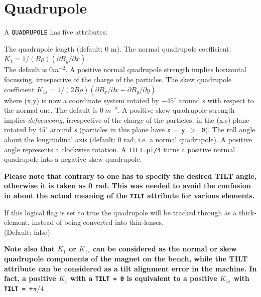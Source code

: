 \section{Quadrupole}
\label{sec:quadrupole}



A \texttt{QUADRUPOLE} has five attributes:     
\begin{madlist}
    The quadrupole length (default: 0 m). 
    The normal quadrupole coefficient:        
     $K_1 = 1/(B \rho) (\partial B_y / \partial x)$.\\ 
     The default is $0 m^{-2}$. A positive normal quadrupole strength
     implies horizontal focussing, irrespective of the charge of the particles.
    The skew quadrupole coefficient 
     $K_{1s} = 1/(2 B \rho) (\partial B_x / \partial x - \partial B_y / \partial y)$\\  
     where (x,y) is now a coordinate system rotated by $-45^\circ$ around s
     with respect to the normal one. The default is $0\ m^{-2}$. A
     positive skew quadrupole strength implies \textsl{defocussing}, 
     irrespective of the charge of the particles,  
     in the (x,s) plane rotated by $45^\circ$
     around \textit{s} (particles in this plane have \texttt{x = y $>$ 0}). 
    The roll angle about the longitudinal axis (default: 0
     rad, i.e. a normal quadrupole). A positive angle represents a
     clockwise rotation. A \texttt{TILT=pi/4} turns a positive normal quadrupole
     into a negative skew quadrupole.          

   \textbf{Please note that contrary to \madeight one has to
     specify the desired TILT angle, otherwise it is taken as
     0 rad. This was needed to avoid the confusion in \madeight
     about the actual meaning of the \texttt{TILT} attribute for
     various elements.} 

     If this logical flag is set to true the quadrupole
    will be tracked through as a thick-element, instead of being
    converted into thin-lenses.\\
    (Default: false)
\end{madlist}

\textbf{Note also that $K_1$ or $K_{1s}$ can be considered as
  the normal or skew quadrupole components of the magnet on
  the bench, while the TILT attribute can be considered as a
  tilt alignment error in the machine. In fact, a positive
  $K_1$ with a \texttt{TILT = 0} is equivalent to a positive $K_{1s}$
  with \texttt{TILT = +$\pi/4$ }} 

